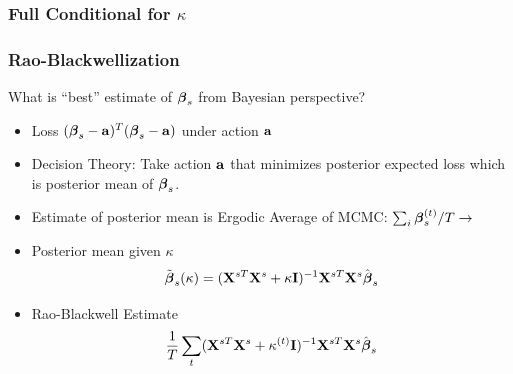 \documentclass[handout]{beamer}\usepackage[]{graphicx}\usepackage[]{color}
\begin{document}
\begin{frame} \frametitle{Full Conditional for $\kappa$}

\end{frame}

\begin{frame}
\frametitle{Rao-Blackwellization}

What is ``best'' estimate of $\boldsymbol{\beta}_s$ from Bayesian perspective?
\begin{itemize}
\item  Loss  $(\boldsymbol{\beta}_s - \mathbf{a})^T(\boldsymbol{\beta}_s - \mathbf{a})$   under action $\mathbf{a}$
\item  Decision Theory:  Take action $\mathbf{a}$ that minimizes posterior
  expected loss which is posterior mean of $\boldsymbol{\beta}_s$.

\item Estimate of posterior mean is Ergodic Average of MCMC:
  $\sum_i \boldsymbol{\beta}_s^{(t)}/T \to $
\item Posterior mean given $\kappa$
  $$\tilde{\boldsymbol{\beta}}_s(\kappa) = (\mathbf{X}^{sT}\mathbf{X}^s + \kappa \mathbf{I})^{-1}  \mathbf{X}^{sT}\mathbf{X}^s \hat{\boldsymbol{\beta}}_s$$ \pause


\item Rao-Blackwell Estimate
  $$\frac{1}{T}\sum_t (\mathbf{X}^{sT}\mathbf{X}^s + \kappa^{(t)} \mathbf{I})^{-1}  \mathbf{X}^{sT}\mathbf{X}^s \hat{\boldsymbol{\beta}}_s$$ \pause


  \end{itemize}



\end{frame}
\end{document}
